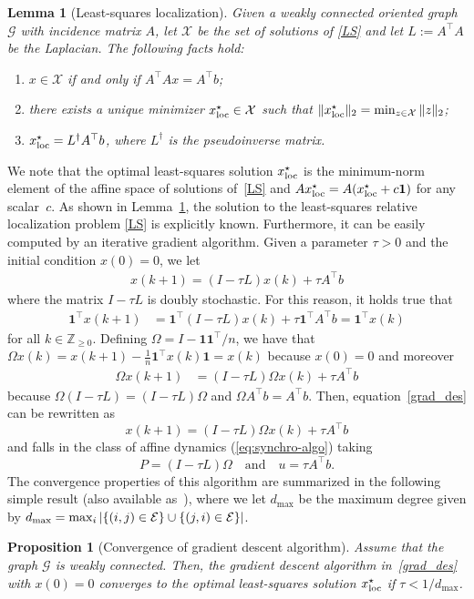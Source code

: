 \documentclass{IEEEtran}
\newtheorem{lemma}{Lemma}
\newtheorem{proposition}{Proposition}
\newcommand{\integernonnegative}{\mathbb{Z}_{\ge 0}}
\newcommand{\1}{\mathbf{1}} \newcommand{\ind}{\mathds{1}}
\begin{document}
\begin{lemma}[Least-squares localization]
\label{lemma:centralized-LS} 
Given a weakly connected oriented graph
$\mathcal{G}$ with incidence matrix $A$, let $\mathcal{X}$ be the set of solutions of \eqref{LS} and let $L:=A^\top A$ be the Laplacian. The following facts hold:
\begin{enumerate}
\item $x \in \mathcal{X}$ if and only if $A^\top Ax =A^\top b$;
\item there exists a unique minimizer $ {x_{\textup{loc}}^{\star}} \in \mathcal{X}$ such that $\| {x_{\textup{loc}}^{\star}} \|_2=\min_{z\in \mathcal{X}}\| z\|_2$;
\item $ {x_{\textup{loc}}^{\star}} =L^{\dag} A^\top b$,
where $L^{\dag}$ is the pseudoinverse matrix.
\end{enumerate}
\end{lemma}

We note that the optimal least-squares solution $ {x_{\textup{loc}}^{\star}} $ is the minimum-norm element of the affine space of solutions of~\eqref{LS} and $A\loc=A( \loc +c\1)$ for any scalar~$c$.
As shown in Lemma~\ref{lemma:centralized-LS}, the solution to the least-squares relative localization problem \eqref{LS} is explicitly known. Furthermore, it can be easily computed by an iterative gradient algorithm.
Given a parameter $\tau>0$ and the initial condition $x(0)=0$, we let 
\begin{align}\label{grad_des}
x(k+1)=(I-\tau L)x(k)+\tau A^\top b
\end{align}
where the matrix $I-\tau L$ is doubly stochastic. For this reason, it holds true that
\begin{align*}
\1^{\top}x(k+1)&=\1^{\top}(I-\tau L)x(k)+ \tau\1^{\top} A^\top b
=\1^{\top}x(k)
\end{align*}
for all $k\in\integernonnegative$.
Defining $\Omega=I-\1\1^{\top}/n$, we have that $\Omega x(k)=x(k+1)- \frac1n \1^{\top}x(k) \1=x(k)$
because $x(0)=0$ and moreover
\begin{align*}
\Omega x(k+1)&=(I-\tau L)\Omega x(k)+ \tau A^\top b
\end{align*}
because $\Omega (I-\tau L)=(I-\tau L)\Omega$ and $\Omega A^\top b=A^\top b.$
Then, equation~\eqref{grad_des} can be rewritten as
$$ x(k+1)=(I-\tau L)\Omega x(k)+ \tau A^\top b $$
and falls in the class of affine dynamics
(\ref{eq:synchro-algo}) taking
\begin{equation}\label{Pu-def-localization} P=(I-\tau L)\Omega \quad \text{and} \quad u=\tau A^\top b.\end{equation}
The convergence properties of this algorithm are summarized in the following simple result (also available as~\cite[Proposition~1]{WSR-PF-FF:12}), where we let $d_{\max}$ be the maximum degree given by $d_{\max}=\max_i|\{(i,j)\in \mathcal{E}\}\cup \{(j,i)\in \mathcal{E}\}|$.
\begin{proposition}[Convergence of gradient descent algorithm]
Assume that the graph $\mathcal{G}$ is weakly connected. Then, the gradient descent algorithm in~\eqref{grad_des} with $x(0)=0$ converges to the optimal least-squares solution $ {x_{\textup{loc}}^{\star}} $ if $\tau<1/d_{\max}$. \end{proposition}
\end{document}
